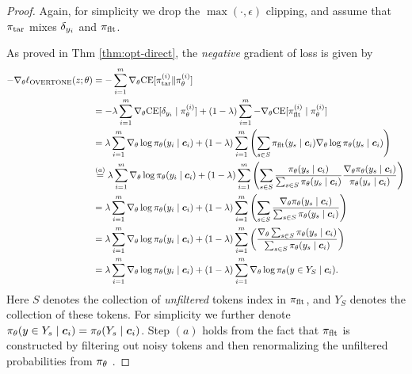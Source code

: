 \begin{proof}
Again, for simplicity we drop the $\max(\cdot, \epsilon)$ clipping, and assume that $\pi_\text{tar}$ mixes $\de{y_i}{}$ and $\pi_\text{flt}$. 

As proved in Thm \ref{thm:opt-direct}, 
the \textit{negative} gradient of {\NAME} loss is given by 
\begin{align*}
- \nabla_\theta \ell_{\NAME} (z; \theta) 
&=  
- \sum_{i=1}^m \nabla_\theta \ce [\pit^{(i)} \| \pil^{(i)}] \\
&= 
- \lambda \sum_{i=1}^m \nabla_\theta \ce [\de{y_i}{} \mid \pil^{(i)}] + (1 - \lambda) \sum_{i=1}^m - \nabla_\theta \ce [\pif^{(i)} \mid \pil^{(i)}] \\
&= 
\lambda \sum_{i=1}^m \nabla_\theta \log \pil(y_i \mid \cv_i) + 
(1-\lambda) \sum_{i=1}^m \left(\sum_{s\in S} \pif(y_s \mid \cv_i) \nabla_\theta \log \pil (y_s \mid \cv_i) \right) \\
&\overset{(a)}{=}
\lambda \sum_{i=1}^m \nabla_\theta \log \pil(y_i \mid \cv_i) + 
(1-\lambda) \sum_{i=1}^m \left(\sum_{s\in S} 
\frac{\pil(y_s \mid \cv_i)}{\sum_{s\in S} \pil(y_s \mid \cv_i)} \frac{\nabla_\theta \pil (y_s \mid \cv_i)}{\pil (y_s \mid \cv_i)} \right) \\
&= 
\lambda \sum_{i=1}^m \nabla_\theta \log \pil(y_i \mid \cv_i) + 
(1-\lambda) \sum_{i=1}^m \left(\sum_{s\in S} 
\frac{\nabla_\theta \pil(y_s \mid \cv_i)}{\sum_{s\in S} \pil(y_s \mid \cv_i)}  \right) \\
&= 
\lambda \sum_{i=1}^m \nabla_\theta \log \pil(y_i \mid \cv_i) + 
(1-\lambda) \sum_{i=1}^m \left(
\frac{\nabla_\theta \sum_{s\in S} \pil(y_s \mid \cv_i)}{\sum_{s\in S} \pil(y_s \mid \cv_i)}  \right) \\
&=
\lambda \sum_{i=1}^m \nabla_\theta \log \pil(y_i \mid \cv_i) + 
(1-\lambda) \sum_{i=1}^m \nabla_\theta \log \pil(y \in Y_S \mid \cv_i).
% 
\end{align*}
%
Here
$S$ denotes the collection of \textit{unfiltered} tokens index in $\pi_\text{flt}$, and $Y_S$ denotes the collection of these tokens. For simplicity we further denote $\pi_\theta(y \in Y_s \mid {\boldsymbol{c}}_i) = \pi_\theta (Y_s \mid {\boldsymbol{c}}_i)$. 
Step $(a)$ holds from the fact that $\pi_\text{flt}$ is constructed by filtering out noisy tokens and then renormalizing the unfiltered probabilities from $\pi_\theta$ \citep{}.


\end{proof}
